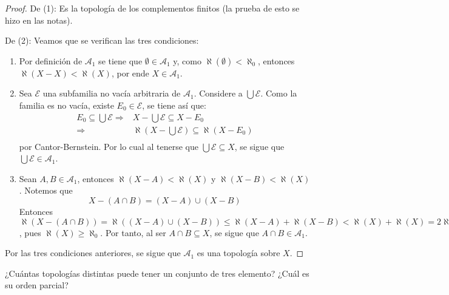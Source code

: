\documentclass[12pt]{report}
\theoremstyle{largebreak}
\begin{document}
    \begin{proof}
        De (1): Es la topología de los complementos finitos (la prueba de esto se hizo en las notas).

        De (2): Veamos que se verifican las tres condiciones:
        \begin{enumerate}
            \item Por definición de $\mathcal{A}_1$ se tiene que $\emptyset\in\mathcal{A}_1$ y, como $\aleph(\emptyset)<\aleph_0$, entonces $\aleph(X-X)<\aleph(X)$, por ende $X\in\mathcal{A}_1$.
            \item Sea $\mathcal{E}$ una subfamilia no vacía arbitraria de $\mathcal{A}_1$. Considere a $\bigcup\mathcal{E}$. Como la familia es no vacía, existe $E_0\in\mathcal{E}$, se tiene así que:
            \begin{equation*}
                \begin{split}
                    E_0\subseteq \bigcup\mathcal{E}\Rightarrow& X- \bigcup\mathcal{E}\subseteq X-E_0\\
                    \Rightarrow& \aleph\left(X- \bigcup\mathcal{E}\right) \subseteq \aleph(X-E_0) \\
                \end{split}
            \end{equation*}
            por Cantor-Bernstein. Por lo cual al tenerse que $\bigcup\mathcal{E}\subseteq X$, se sigue que $\bigcup\mathcal{E}\in\mathcal{A}_1$.
            \item Sean $A,B\in\mathcal{A}_1$, entonces $\aleph(X-A)<\aleph(X)$ y $\aleph(X-B)<\aleph(X)$. Notemos que
            \begin{equation*}
                X-(A\cap B)=(X-A)\cup (X-B)
            \end{equation*}
            Entonces $\aleph(X-(A\cap B))=\aleph((X-A)\cup (X-B))\leq\aleph(X-A)+\aleph(X-B)< \aleph(X)+\aleph(X)=2\aleph(X)=\aleph(X)$, pues $\aleph(X)\geq\aleph_0$. Por tanto, al ser $A\cap B\subseteq X$, se sigue que $A\cap B\in \mathcal{A}_1$.
        \end{enumerate}
        Por las tres condiciones anteriores, se sigue que $\mathcal{A}_1$ es una topología sobre $X$.
    \end{proof}

    \begin{excer}
        ¿Cuántas topologías distintas puede tener un conjunto de tres elemento? ¿Cuál es su orden parcial?
    \end{excer}
\end{document}
